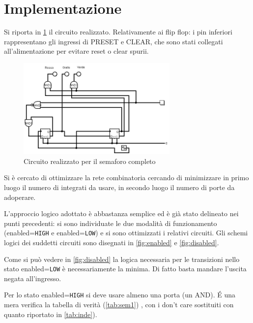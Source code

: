 \documentclass[a4paper,10pt]{article}
\def\code#1{\texttt{#1}}
\begin{document}
\section{Implementazione}

Si riporta in \cref{fig:circuit} il circuito realizzato.
Relativamente ai flip flop: i pin inferiori rappresentano gli ingressi di PRESET e CLEAR, che sono stati collegati all'alimentazione per evitare reset o clear spurii.

\begin{figure}[H]
	\centering
	\includegraphics[width=0.7\textwidth]{../grafici/circuito1.png}
	\caption{Circuito realizzato per il semaforo completo}
	\label{fig:circuit}
\end{figure}


Si è cercato di ottimizzare la rete combinatoria cercando di minimizzare in primo luogo il numero di integrati da usare, in secondo luogo il numero di porte da adoperare.

L'approccio logico adottato è abbastanza semplice ed è già stato delineato nei punti precedenti: si sono individuate le due modalità di funzionamento (enabled=\code{HIGH} e enabled=\code{LOW}) e si sono ottimizzati i relativi circuiti. 
Gli schemi logici dei suddetti circuiti sono disegnati in \cref{fig:enabled} e \cref{fig:disabled}.
\newline


Come si può vedere in \cref{fig:disabled} la logica necessaria per le transizioni nello stato enabled=\code{LOW} è necessariamente la minima. Di fatto basta mandare l'uscita negata all'ingresso.


Per lo stato enabled=\code{HIGH} si deve usare almeno una porta (un AND). 
\'E una mera verifica la tabella di verità (\cref{tab:sem1}) , con i don't care sostituiti con quanto riportato in \cref{tab:inde}).
\end{document}
